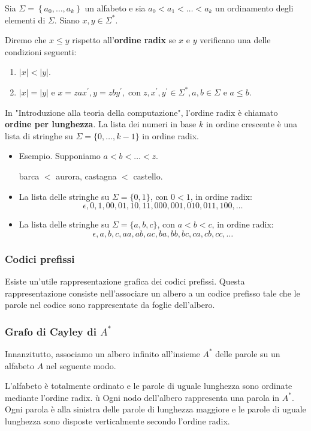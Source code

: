 Sia $\Sigma=\left\{a_{0}, \ldots, a_{k}\right\}$ un alfabeto e sia $a_{0}<a_{1}<\ldots<a_{k}$ un ordinamento degli elementi di $\Sigma$. Siano $x, y \in \Sigma^{*}$.

Diremo che $x \leq y$ rispetto all'\textbf{ordine radix} se $x$ e $y$ verificano una delle condizioni seguenti:
\begin{enumerate}
\item  $|x|<|y|$.
\item  $|x|=|y|$ e $x=z a x^{\prime}, y=z b y^{\prime}, \operatorname{con} z, x^{\prime}, y^{\prime} \in \Sigma^{*}, a, b \in \Sigma$ e $a \leq b$.
\end{enumerate}

In "Introduzione alla teoria della computazione", l'ordine radix è chiamato \textbf{ordine per lunghezza}.
La lista dei numeri in base $k$ in ordine crescente è una lista di stringhe su $\Sigma=\{0, \ldots, k-1\}$ in ordine radix.
\begin{itemize}
    \item Esempio. Supponiamo $a<b<\ldots<z$.
    
barca $<$ aurora, castagna $<$ castello.
    \item La lista delle stringhe su $\Sigma=\{0,1\}$, con $0<1$, in ordine radix:
$$
\epsilon, 0,1,00,01,10,11,000,001,010,011,100, \ldots
$$
    \item La lista delle stringhe su $\Sigma=\{a, b, c\}$, con $a<b<c$, in ordine radix:
$$
\epsilon, a, b, c, a a, a b, a c, b a, b b, b c, c a, c b, c c, \ldots
$$
\end{itemize}

\subsubsection{Codici prefissi}

Esiste un'utile rappresentazione grafica dei codici prefissi.
Questa rappresentazione consiste nell'associare un albero a un
codice prefisso tale che le parole nel codice sono rappresentate da
foglie dell'albero.

\subsubsection{Grafo di Cayley di $A^*$}

Innanzitutto, associamo un albero infinito all'insieme $A^{*}$ delle parole su un alfabeto $A$ nel seguente modo.

L'alfabeto è totalmente ordinato e le parole di uguale lunghezza sono ordinate mediante l'ordine radix.
ù
Ogni nodo dell'albero rappresenta una parola in $A^{*}$. Ogni parola è alla sinistra delle parole di lunghezza maggiore e le parole di uguale lunghezza sono disposte verticalmente secondo l'ordine radix.

